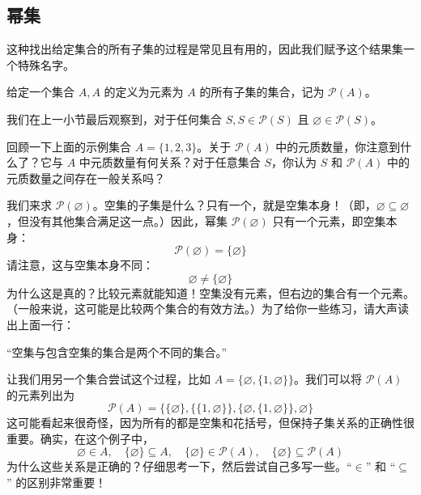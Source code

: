 \subsection{幂集}

这种找出给定集合的所有子集的过程是常见且有用的，因此我们赋予这个结果集一个特殊名字。

\begin{definition}
    给定一个集合 $A, A$ 的定义为元素为 $A$ 的所有子集的集合，记为 $\mathcal{P}(A)$。
\end{definition}

我们在上一小节最后观察到，对于任何集合 $S, S \in \mathcal{P}(S)$ 且 $\varnothing \in \mathcal{P}(S)$。

回顾一下上面的示例集合 $A = \{1, 2, 3\}$。关于 $\mathcal{P}(A)$ 中的元质数量，你注意到什么了？它与 $A$ 中元质数量有何关系？对于任意集合 $S$，你认为 $S$ 和 $\mathcal{P}(A)$ 中的元质数量之间存在一般关系吗？\\

\begin{example}
    我们来求 $\mathcal{P}(\varnothing)$。空集的子集是什么？只有一个，就是空集本身！（即，$\varnothing \subseteq \varnothing$，但没有其他集合满足这一点。）因此，幂集 $\mathcal{P}(\varnothing)$ 只有一个元素，即空集本身：
    \[\mathcal{P}(\varnothing) = \{ \varnothing \}\]
    请注意，这与空集本身不同：
    \[\varnothing \ne \{ \varnothing \}\]
    为什么这是真的？比较元素就能知道！空集没有元素，但右边的集合有一个元素。（一般来说，这可能是比较两个集合的有效方法。）为了给你一些练习，请大声读出上面一行：
    \begin{center}
        ``空集与包含空集的集合是两个不同的集合。''
    \end{center}
\end{example}

\begin{example}
    让我们用另一个集合尝试这个过程，比如 $A = \{\varnothing, \{1, \varnothing\}\}$。我们可以将 $\mathcal{P}(A)$ 的元素列出为
    \[\mathcal{P}(A) = \{\{\varnothing\}, \{\{1, \varnothing\}\}, \{\varnothing, \{1, \varnothing\}\}, \varnothing \}\]
    这可能看起来很奇怪，因为所有的都是空集和花括号，但保持子集关系的正确性很重要。确实，在这个例子中，
    \[\varnothing \in A, \quad \{\varnothing\} \subseteq A, \quad \{\varnothing\} \in \mathcal{P}(A), \quad \{\varnothing\} \subseteq \mathcal{P}(A)\]
    为什么这些关系是正确的？仔细思考一下，然后尝试自己多写一些。``$\in$'' 和 ``$\subseteq$'' 的区别非常重要！
\end{example}
